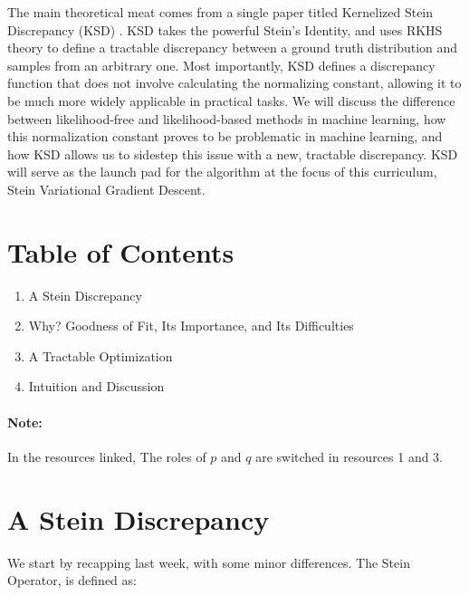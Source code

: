 \documentclass[12pt]{article}
\begin{document}
	\MakeScribeTop


The main theoretical meat comes from a single paper titled Kernelized Stein Discrepancy (KSD) \cite{liu2016kernelized}. KSD takes the powerful Stein's Identity, and uses RKHS theory to define a tractable discrepancy between a ground truth distribution and samples from an arbitrary one. Most importantly, KSD defines a discrepancy function that does not involve calculating the normalizing constant, allowing it to be much more widely applicable in practical tasks. We will discuss the difference between likelihood-free and likelihood-based methods in machine learning, how this normalization constant proves to be problematic in machine learning, and how KSD allows us to sidestep this issue with a new, tractable discrepancy. KSD will serve as the launch pad for the algorithm at the focus of this curriculum, Stein Variational Gradient Descent. 

\section{Table of Contents}

\begin{enumerate}
    \item A Stein Discrepancy
    \item Why? Goodness of Fit, Its Importance, and Its Difficulties
    \item A Tractable Optimization
    \item Intuition and Discussion
\end{enumerate}

\paragraph{Note:} In the resources linked, The roles of $p$ and $q$ are switched in resources 1 and 3.

\section{A Stein Discrepancy}

We start by recapping last week, with some minor differences. The Stein Operator, is defined as:
\end{document}
